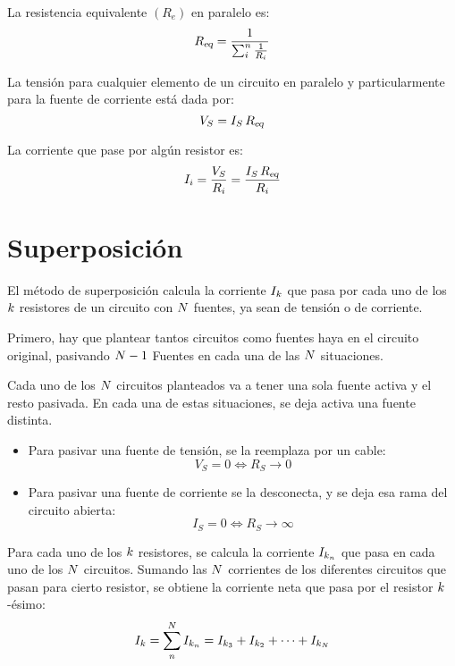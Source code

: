 \documentclass[a5paper,12pt,twoside]{book}
\begin{document}
La resistencia equivalente $(R_e)$ en paralelo es:
\begin{equation*}
    {{R}_\textsl{{eq}}} = \frac{1}{\sum_i^n \frac{1}{R_i}}
\end{equation*}

La tensión para cualquier elemento de un circuito en paralelo y particularmente para la fuente de corriente está dada por:
\begin{equation*}
    V_S = I_S \, {{R}_\textsl{{eq}}}
\end{equation*}

La corriente que pase por algún resistor es:
\begin{equation*}
    I_i = \frac{V_S}{R_i} = \frac{I_S \, {{R}_\textsl{{eq}}}}{R_i}
\end{equation*}


\section{Superposición}

El método de superposición calcula la corriente $I_k$ que pasa por cada uno de los $k$ resistores de un circuito con $N$ fuentes, ya sean de tensión o de corriente.

Primero, hay que plantear tantos circuitos como fuentes haya en el circuito original, pasivando $N-1$ Fuentes en cada una de las $N$ situaciones.

Cada uno de los $N$ circuitos planteados va a tener una sola fuente activa y el resto pasivada.
En cada una de estas situaciones, se deja activa una fuente distinta.

\begin{itemize}
    \item Para pasivar una fuente de tensión, se la reemplaza por un cable:
    \begin{equation*}
        V_S = 0 \iff R_S \to 0
    \end{equation*}

    \item Para pasivar una fuente de corriente se la desconecta, y se deja esa rama del circuito abierta:
    \begin{equation*}
        I_S = 0 \iff R_S \to \infty
    \end{equation*}
\end{itemize}

Para cada uno de los $k$ resistores, se calcula la corriente $I_{k_n}$ que pasa en cada uno de los $N$ circuitos.
Sumando las $N$ corrientes de los diferentes circuitos que pasan para cierto resistor, se obtiene la corriente neta que pasa por el resistor $k$-ésimo:
\begin{equation*}
    I_k = \sum_n^N I_{k_n} = I_{k_3} + I_{k_2} + \dots + I_{k_N}
\end{equation*}
\end{document}
